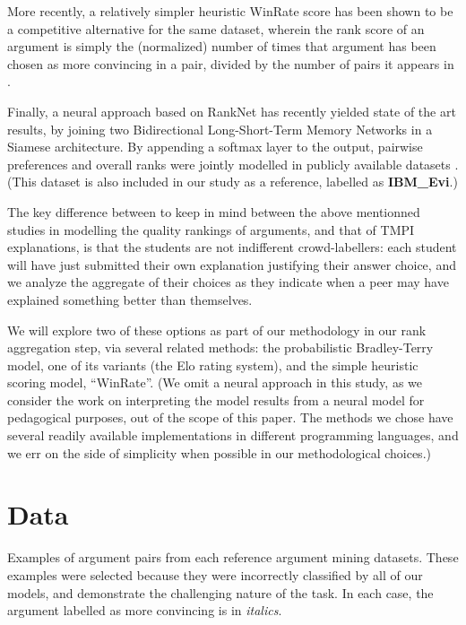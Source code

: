 \documentclass[notitlepage,12pt]{jedm}
\begin{document}
More recently, a relatively simpler heuristic WinRate score has been shown to 
be a competitive alternative for the same dataset, wherein the rank score of an 
argument is simply the (normalized) number of times that argument has been 
chosen as more convincing in a pair, divided by the number of pairs it appears 
in \cite{potash_ranking_2019}.

Finally, a neural approach based on RankNet has recently yielded state of the 
art results, by joining two Bidirectional Long-Short-Term Memory Networks in a 
Siamese architecture. By appending a softmax layer to the output, pairwise 
preferences and overall ranks were jointly modelled in publicly available 
datasets \cite{gleize_are_2019}.
(This dataset is also included in our study as a reference, labelled as 
\textbf{IBM\_Evi}.)

The key difference between to keep in mind between the above mentionned studies 
in modelling the quality rankings of arguments, and that of TMPI explanations, 
is that the students are not indifferent crowd-labellers: each student will 
have just submitted their own explanation justifying their answer choice, and 
we analyze the aggregate of their choices as they indicate when a peer may have 
explained something better than themselves.

We will explore two of these options as part of our methodology in our rank 
aggregation step, via several related methods: the probabilistic Bradley-Terry 
model, one of its variants (the Elo rating system), and the simple heuristic 
scoring model, ``WinRate''.
(We omit a neural approach in this study, as we consider the work on 
interpreting the model results from a neural model for pedagogical purposes, 
out of the scope of this paper.
The methods we chose have several readily available implementations in 
different programming languages, and we err on the side of simplicity when 
possible in our methodological choices.)



\section{Data}\label{sec:datasets}

\begin{table}
	\caption{
		Examples of argument pairs from each reference argument mining 
		datasets. 
		These examples were selected because they were incorrectly classified 
		by all of our models, and demonstrate the challenging nature of the 
		task. 
		In each case, the argument labelled as more convincing is in 
		\textit{italics}.
	}
	\label{tab:sample_obs}
	\begin{subtable}[t]{\textwidth}
		
	\end{subtable}
	\begin{subtable}[t]{\textwidth}
		
	\end{subtable}
\end{table}
\end{document}
